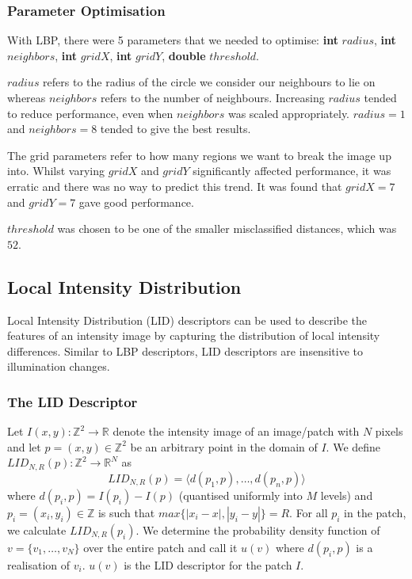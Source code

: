 \documentclass{article}
\begin{document}
\subsubsection{Parameter Optimisation}
With LBP, there were 5 parameters that we needed to optimise: \textbf{int} $radius$, \textbf{int} $neighbors$, \textbf{int} $gridX$, \textbf{int} $gridY$, \textbf{double} $threshold$.

$radius$ refers to the radius of the circle we consider our neighbours to lie on whereas $neighbors$ refers to the number of neighbours. Increasing $radius$ tended to reduce performance, even when $neighbors$ was scaled appropriately. $radius=1$ and $neighbors=8$ tended to give the best results.

The grid parameters refer to how many regions we want to break the image up into. Whilst varying $gridX$ and $gridY$ significantly affected performance, it was erratic and there was no way to predict this trend. It was found that $gridX=7$ and $gridY=7$ gave good performance.

$threshold$ was chosen to be one of the smaller misclassified distances, which was $52$.

\subsection{Local Intensity Distribution}
Local Intensity Distribution (LID) descriptors can be used to describe the features of an intensity image by capturing the distribution of local intensity differences. Similar to LBP descriptors, LID descriptors are insensitive to illumination changes.

\subsubsection{The LID Descriptor}
Let $I(x,y) : \mathbb{Z}^2 \rightarrow \mathbb{R}$ denote the intensity image of an image/patch with $N$ pixels and let $p = (x,y) \in \mathbb{Z}^2$ be an arbitrary point in the domain of $I$. We define $LID_{N,R}(p) : \mathbb{Z}^2 \rightarrow \mathbb{R}^N$ as
\begin{equation}
   LID_{N,R}(p) = \langle d(p_1,p), \ldots, d(p_n,p)\rangle
\end{equation}
where $d(p_i,p) = I(p_i) - I(p)$ (quantised uniformly into $M$ levels) and $p_i = (x_i, y_i) \in \mathbb{Z}$ is such that $max\{|x_i - x|, |y_i - y|\} = R$.
For all $p_i$ in the patch, we calculate $ LID_{N,R}(p_i)$.
We determine the probability density function of $v=\{v_1,\ldots,v_N\}$ over the entire patch and call it $u(v)$ where $d(p_i,p)$ is a realisation of $v_i$. $u(v)$ is the LID descriptor for the patch $I$.
\end{document}
